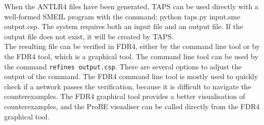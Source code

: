When the ANTLR4 files have been generated, TAPS can be used directly with a well-formed SMEIL program with the command: {\ttfamily python taps.py input.sme output.csp}. The system requires both an input file and an output file. If the output file does not exist, it will be created by TAPS. \\

The resulting \cspm{} file can be verified in FDR4, either by the command line tool or by the FDR4 tool, which is a graphical tool. The command line tool can be used by the command \texttt{refines output.csp}. There are several options to adjust the output of the command. The FDR4 command line tool is mostly used to quickly check if a network passes the verification, because it is difficult to navigate the counterexamples. The FDR4 graphical tool provides a better visualisation of counterexamples, and the ProBE visualiser can be called directly from the FDR4 graphical tool.

